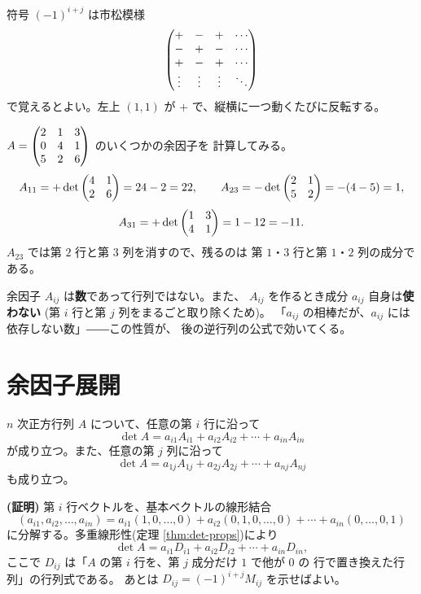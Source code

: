 符号 $(-1)^{i+j}$ は市松模様
\[
\begin{pmatrix}+ & - & + & \cdots \\ - & + & - & \cdots \\ + & - & + & \cdots \\ \vdots & \vdots & \vdots & \ddots\end{pmatrix}
\]
で覚えるとよい。左上 $(1,1)$ が $+$ で、縦横に一つ動くたびに反転する。

\begin{rei}[余因子の計算]\label{rei:cof-compute}
$A = \begin{pmatrix}2 & 1 & 3 \\ 0 & 4 & 1 \\ 5 & 2 & 6\end{pmatrix}$ のいくつかの余因子を
計算してみる。
\[
A_{11} = +\det \begin{pmatrix}4 & 1 \\ 2 & 6\end{pmatrix} = 24 - 2 = 22, \qquad
A_{23} = -\det \begin{pmatrix}2 & 1 \\ 5 & 2\end{pmatrix} = -(4 - 5) = 1,
\]
\[
A_{31} = +\det \begin{pmatrix}1 & 3 \\ 4 & 1\end{pmatrix} = 1 - 12 = -11.
\]
$A_{23}$ では第 $2$ 行と第 $3$ 列を消すので、残るのは
第 $1$・$3$ 行と第 $1$・$2$ 列の成分である。
\end{rei}

\begin{chui}
余因子 $A_{ij}$ は\textbf{数}であって行列ではない。また、
$A_{ij}$ を作るとき成分 $a_{ij}$ 自身は\textbf{使わない}
(第 $i$ 行と第 $j$ 列をまるごと取り除くため)。
「$a_{ij}$ の相棒だが、$a_{ij}$ には依存しない数」――この性質が、
後の逆行列の公式で効いてくる。
\end{chui}

\section{余因子展開}

\begin{teiri}[余因子展開]\label{thm:cofactor-exp}
$n$ 次正方行列 $A$ について、任意の第 $i$ 行に沿って
\[
\det A = a_{i1} A_{i1} + a_{i2} A_{i2} + \cdots + a_{in} A_{in}
\]
が成り立つ。また、任意の第 $j$ 列に沿って
\[
\det A = a_{1j} A_{1j} + a_{2j} A_{2j} + \cdots + a_{nj} A_{nj}
\]
も成り立つ。
\end{teiri}

\noindent\textbf{(証明)}\quad
第 $i$ 行ベクトルを、基本ベクトルの線形結合
\[
(a_{i1}, a_{i2}, \dots, a_{in})
= a_{i1}(1, 0, \dots, 0) + a_{i2}(0, 1, 0, \dots, 0) + \cdots
+ a_{in}(0, \dots, 0, 1)
\]
に分解する。多重線形性(定理 \ref{thm:det-props})により
\[
\det A = a_{i1} D_{i1} + a_{i2} D_{i2} + \cdots + a_{in} D_{in},
\]
ここで $D_{ij}$ は「$A$ の第 $i$ 行を、第 $j$ 成分だけ $1$ で他が $0$ の
行で置き換えた行列」の行列式である。
あとは $D_{ij} = (-1)^{i+j} M_{ij}$ を示せばよい。

